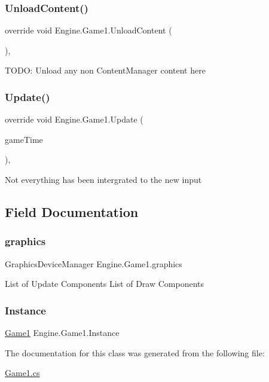 \subsubsection{\texorpdfstring{Unload\+Content()}{UnloadContent()}}
{\footnotesize\ttfamily override void Engine.\+Game1.\+Unload\+Content (\begin{DoxyParamCaption}{ }\end{DoxyParamCaption})\hspace{0.3cm}{\ttfamily [inline]}, {\ttfamily [protected]}}

T\+O\+DO\+: Unload any non Content\+Manager content here \mbox{\label{a00306_a5ec7bcee1272c1a62a77292cd95d043f}} 
\subsubsection{\texorpdfstring{Update()}{Update()}}
{\footnotesize\ttfamily override void Engine.\+Game1.\+Update (\begin{DoxyParamCaption}\item[{Game\+Time}]{game\+Time }\end{DoxyParamCaption})\hspace{0.3cm}{\ttfamily [inline]}, {\ttfamily [protected]}}

Not everything has been intergrated to the new input 

\subsection{Field Documentation}
\mbox{\label{a00306_a6080a5540f79b78b6604cba45c3e0817}} 
\subsubsection{\texorpdfstring{graphics}{graphics}}
{\footnotesize\ttfamily Graphics\+Device\+Manager Engine.\+Game1.\+graphics}

List of Update Components List of Draw Components \mbox{\label{a00306_a6edc487a30ce1f26309e430b29e25f72}} 
\subsubsection{\texorpdfstring{Instance}{Instance}}
{\footnotesize\ttfamily \hyperlink{a00306}{Game1} Engine.\+Game1.\+Instance\hspace{0.3cm}{\ttfamily [static]}}



The documentation for this class was generated from the following file\+:\begin{DoxyCompactItemize}
\item 
\hyperlink{a00008}{Game1.\+cs}\end{DoxyCompactItemize}
